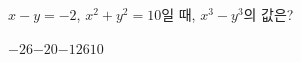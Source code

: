 $x-y=-2$, $x^2+y^2=10$일 때, $x^3-y^3$의 값은?
\begin{choices32}{$-26$}{$-20$}{$-12$}{$6$}{$10$}\end{choices32}

